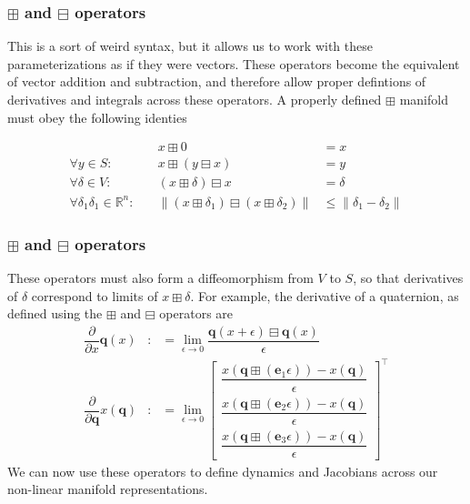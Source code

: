 \documentclass{beamer}
\begin{document}
\begin{frame}
\frametitle{$\boxplus$ and $\boxminus$ operators}
This is a sort of weird syntax, but it allows us to work with these
parameterizations as if they were vectors. These operators become
the equivalent of vector addition and subtraction, and therefore allow
proper defintions of derivatives and integrals across these operators.
A properly defined $\boxplus$ manifold must obey the following identies

\begin{eqnarray}
 & x\boxplus0 & =x\\
\forall y\in S:\quad & x\boxplus\left(y\boxminus x\right) & =y\\
\forall\delta\in V:\quad & (x\boxplus\delta)\boxminus x & =\delta\\
\forall\delta_{1}\delta_{1}\in\mathbb{R}^{n}:\quad & \lVert(x\boxplus\delta_{1})\boxminus(x\boxplus\delta_{2})\rVert & \leq\lVert\delta_{1}-\delta_{2}\rVert
\end{eqnarray}
\end{frame}

\begin{frame}
\frametitle{$\boxplus$ and $\boxminus$ operators}
These operators must also form a diffeomorphism from $V$ to $S$,
so that derivatives of $\delta$ correspond to limits of $x\boxplus\delta$.
For example, the derivative of a quaternion, as defined using the
$\boxplus$ and $\boxminus$ operators are
\begin{eqnarray}
\dfrac{\partial}{\partial x}\boldsymbol{q}(x) & : & =\lim_{\epsilon\rightarrow0}\dfrac{\boldsymbol{q}(x+\epsilon)\boxminus\boldsymbol{q}(x)}{\epsilon}\\
\dfrac{\partial}{\partial\boldsymbol{q}}x(\boldsymbol{q}) & : & =\lim_{\epsilon\rightarrow0}\left[\begin{array}{c}
\dfrac{x\left(\boldsymbol{q}\boxplus(\boldsymbol{e}_{1}\epsilon)\right)-x\left(\boldsymbol{q}\right)}{\epsilon}\\
\dfrac{x\left(\boldsymbol{q}\boxplus(\boldsymbol{e}_{2}\epsilon)\right)-x\left(\boldsymbol{q}\right)}{\epsilon}\\
\dfrac{x\left(\boldsymbol{q}\boxplus(\boldsymbol{e}_{3}\epsilon)\right)-x\left(\boldsymbol{q}\right)}{\epsilon}
\end{array}\right]^{\top}
\end{eqnarray}
We can now use these operators to define dynamics and Jacobians across
our non-linear manifold representations.
\end{frame}
\end{document}

